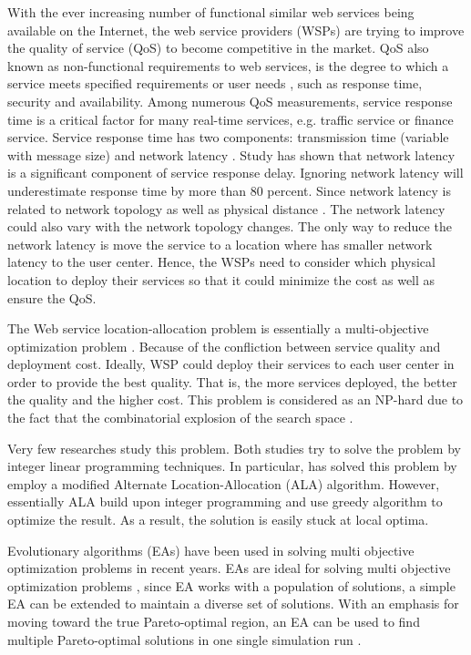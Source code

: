 \documentclass{llncs}
\begin{document}
With the ever increasing number of functional similar web services being available on the Internet, the web service providers (WSPs) are trying to improve the quality of service (QoS) to become competitive in the market.  
QoS also known as non-functional requirements to  web services, is the degree to which a service meets specified requirements or user needs \cite{4061431}, such as response time, security and availability. 
Among numerous QoS measurements, service response time is a critical factor for many real-time services, e.g. traffic service or finance service. 
Service response time has two components: transmission time (variable with message size) and network latency \cite{Johansson}. 
Study \cite{916684} has shown that network latency is a significant component of service response delay.
Ignoring network latency will underestimate response time by more than 80 percent. Since network latency is related to network topology as well as physical distance \cite{distanceMetrics}. 
The network latency could also vary with the network topology changes.
The only way to reduce the network latency is move the service to a location where has smaller network latency to the user center. 
Hence, the WSPs need to consider which physical location to deploy their services so that it could minimize the cost as well as ensure the QoS.

The Web service location-allocation problem is essentially a multi-objective optimization problem \cite{Multiobjective}.
Because of the confliction between service quality and deployment cost. 
Ideally, WSP could deploy their services to each user center in order to provide the best quality.
That is, the more services deployed, the better the quality and the higher cost. 
This problem is considered as an NP-hard due to the fact that the combinatorial explosion of the search space \cite{Vanrompay}. 


Very few researches \cite{Aboolian} \cite{Sun} study this problem.
Both studies try to solve the problem by integer linear programming techniques.
In particular, \cite{Sun} has solved this problem by employ a modified Alternate Location-Allocation (ALA) algorithm. 
However, essentially ALA build upon integer programming and use greedy algorithm to optimize the result. 
As a result, the solution is easily stuck at local optima.

Evolutionary algorithms (EAs) have been used in solving multi objective optimization problems in recent years. 
EAs are ideal for solving multi objective optimization problems \cite{key:article}, since EA works with a population of solutions, 
a simple EA can be extended to maintain a diverse set of solutions.
With an emphasis for moving toward the true Pareto-optimal region, an EA can be used to find multiple Pareto-optimal solutions in one single simulation run \cite{OptimizationElectrical}.
\end{document}
